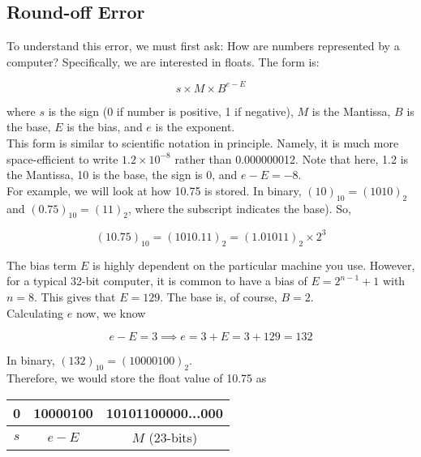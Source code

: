\documentclass[]{article}
\begin{document}
\subsection{Round-off Error}\bigbreak

To understand this error, we must first ask: How are numbers represented by a computer? Specifically, we are interested in floats. The form is:

\begin{equation}
	s \times M \times B^{e - E}
\end{equation}

where $s$ is the sign (0 if number is positive, 1 if negative), $M$ is the Mantissa, $B$ is the base, $E$ is the bias, and $e$ is the exponent. \\

This form is similar to scientific notation in principle. Namely, it is much more space-efficient to write $1.2 \times 10^{-8}$ rather than 0.000000012. Note that here, 1.2 is the Mantissa, 10 is the base, the sign is 0, and $e-E = -8$.\\

For example, we will look at how 10.75 is stored. In binary, $(10)_{10} = (1010)_{2}$ and $(0.75)_{10} = (11)_2$, where the subscript indicates the base). So, 

\[(10.75)_{10} =  (1010.11)_{2} = (1.01011)_{2} \times 2^3\]\bigbreak

The bias term $E$ is highly dependent on the particular machine you use. However, for a typical 32-bit computer, it is common to have a bias of $E = 2^{n-1} + 1$ with $n=8$. This gives that $E=129$. The base is, of course, $B=2$. \\

Calculating $e$ now, we know

\[e - E = 3 \implies e = 3 + E = 3 + 129 = 132\]\bigbreak

In binary, $(132)_{10} = (10000100)_2$.\\

Therefore, we would store the float value of 10.75 as

\begin{table}[h]\centering
	\begin{tabular}{|c|c|c|}
		\hline
		0 & 10000100 & 10101100000...000\\\hline
		\multicolumn{1}{c}{$s$} & \multicolumn{1}{c}{$e - E$} & \multicolumn{1}{c}{$M$ (23-bits)}
	\end{tabular}
\end{table}
\end{document}
